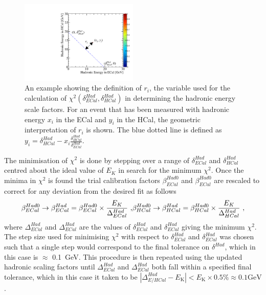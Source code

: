 %
\begin{figure}[h!]
\includegraphics[width=0.5\textwidth]{Calibration/Plots/Calibration/HadScaleSetting/HadScaleECalHCalSelectionExample.pdf}
\caption[An example showing the definition of $r_{i}$, the variable used for the calculation of $\chi^{2}(\delta^{Had}_{ECal}, \delta^{Had}_{HCal})$ in determining the hadronic energy scale factors.]{An example showing the definition of $r_{i}$, the variable used for the calculation of $\chi^{2}(\delta^{Had}_{ECal}, \delta^{Had}_{HCal})$ in determining the hadronic energy scale factors.  For an event that has been measured with hadronic energy $x_{i}$ in the ECal and $y_{i}$ in the HCal, the geometric interpretation of $r_{i}$ is shown.  The blue dotted line is defined as $y_{i} = \delta^{Had}_{HCal} - x_{i} \frac{\delta^{Had}_{HCal}}{\delta^{Had}_{ECal}}$.}
\label{fig:hadscalechi2calc}
\end{figure}
%
\noindent The minimisation of $\chi^{2}$ is done by stepping over a range of $\delta^{Had}_{ECal}$ and $\delta^{Had}_{HCal}$ centred about the ideal value of $E_{K}$ in search for the minimum $\chi^{2}$.  Once the minima in $\chi^{2}$ is found the trial calibration factors $\beta^{Had0}_{ECal}$ and $\beta^{Had0}_{ECal}$ are rescaled to correct for any deviation from the desired fit as follows
%
\begin{equation}
\beta^{Had0}_{ECal} \rightarrow \beta^{Had}_{ECal} = \beta^{Had0}_{ECal} \times \frac{E_{K}}{\Delta^{Had}_{ECal}} \text{ ,}\\
\beta^{Had0}_{HCal} \rightarrow \beta^{Had}_{HCal} = \beta^{Had0}_{HCal} \times \frac{E_{K}}{\Delta^{Had}_{HCal}}\text{ ,}
\end{equation}
%
\noindent where $\Delta^{Had}_{ECal}$ and $\Delta^{Had}_{ECal}$ are the values of $\delta^{Had}_{ECal}$ and $\delta^{Had}_{ECal}$ giving the minimum $\chi^{2}$.  The step size used for minimising $\chi^{2}$ with respect to $\delta^{Had}_{ECal}$ and $\delta^{Had}_{ECal}$ was chosen such that a single step would correspond to the final tolerance on $\delta^{Had}$, which in this case is $\approx$ 0.1~GeV.  This procedure is then repeated using the updated hadronic scaling factors until $\Delta^{Had}_{ECal}$ and $\Delta^{Had}_{ECal}$ both fall within a specified final tolerance, which in this case it taken to be $|\Delta^{Had}_{E/HCal} - E_{\text{{K}}}| < E_{\text{{K}}} \times 0.5 \% \approx 0.1 \text{GeV}$.

